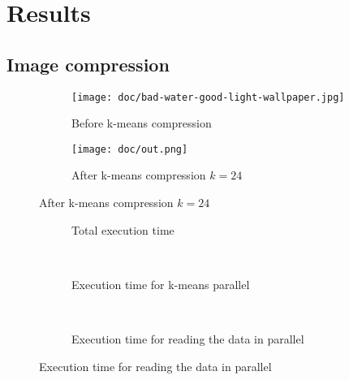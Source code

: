 
\section{Results}

\subsection{Image compression}

\begin{figure}[ht!]
    \centering
    \begin{subfigure}[t]{1\textwidth}
        \centering
        \texttt{[image: doc/bad-water-good-light-wallpaper.jpg]}
        \caption{Before k-means compression}
    \end{subfigure}
    \begin{subfigure}[t]{1\textwidth}
        \centering
        \texttt{[image: doc/out.png]}
        \caption{After k-means compression $k=24$}
    \end{subfigure}
\end{figure}

\begin{figure}[!ht]
  \centering
  \begin{subfigure}[t]{0.5\textwidth}
    \centering
    \caption{Total execution time}
  \end{subfigure}
  ~
  \begin{subfigure}[t]{0.5\textwidth}
    \centering
    \caption{Execution time for k-means parallel}
  \end{subfigure}
  ~
  \begin{subfigure}[t]{0.5\textwidth}
    \centering
    \caption{Execution time for reading the data in parallel}
  \end{subfigure}
  \label{fig:time_read}
\end{figure}

